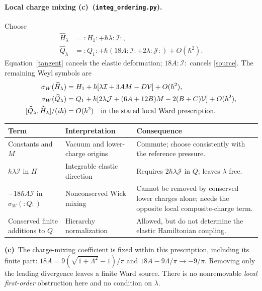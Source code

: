 \documentclass[11pt,a4paper]{article}
\newcommand{\C}{\textbf{(c)}\ }
\newcommand{\file}[1]{\nolinkurl{#1}}
\newcommand{\ord}{\file{integ_ordering.py}}
\newcommand{\I}{\mathcal I}
\newcommand{\J}{\mathcal J}
\newcommand{\vol}{\mathcal V}
\begin{document}
\paragraph{Local charge mixing \C (\ord).}
Choose
\begin{align}
 \widehat H_\lambda&=:H_1:+\hbar\lambda:\I:,\\
 \widehat Q_\lambda
 &=\boxed{:Q_1:+\hbar(18A:\I:+2\lambda:\J:)}+O(\hbar^2).\label{corrected}
\end{align}
Equation~\eqref{tangent} cancels the elastic deformation; $18A:\I:$
cancels \eqref{source}. The remaining Weyl symbols are
\begin{align}
 \sigma_W(\widehat H_\lambda)
 &=H_1+\hbar[\lambda\I+3AM-D\vol]+O(\hbar^2),\\
 \sigma_W(\widehat Q_\lambda)
 &=Q_1+\hbar[2\lambda\J+(6A+12B)M-2(B+C)\vol]+O(\hbar^2),\\
 [\widehat Q_\lambda,\widehat H_\lambda]/(i\hbar)&=O(\hbar^2)
 \quad\hbox{in the stated local Ward prescription.}\label{ward}
\end{align}
\begin{center}\small
\begin{tabular}{@{}L{3.5cm}L{5.3cm}L{6.3cm}@{}}\toprule
Term & Interpretation & Consequence\\\midrule
Constants and $M$ & Vacuum and lower-charge origins & Commute; choose
consistently with the reference pressure.\\
$\hbar\lambda\I$ in $H$ & Integrable elastic direction & Requires
$2\hbar\lambda\J$ in $Q$; leaves $\lambda$ free.\\
$-18\hbar A\I$ in $\sigma_W(:Q:)$ & Nonconserved Wick mixing & Cannot
be removed by conserved lower charges alone; needs the opposite local
composite-charge term.\\
Conserved finite additions to $Q$ & Hierarchy normalization & Allowed,
but do not determine the elastic Hamiltonian coupling.\\\bottomrule
\end{tabular}
\end{center}
\C The charge-mixing coefficient is fixed within this prescription,
including its finite part:
$18A=9(\sqrt{1+\Lambda^2}-1)/\pi$ and
$18A-9\Lambda/\pi\longrightarrow-9/\pi$.
Removing only the leading divergence leaves a finite Ward source.
There is no nonremovable \emph{local first-order} obstruction here and no
condition on $\lambda$.
\end{document}
